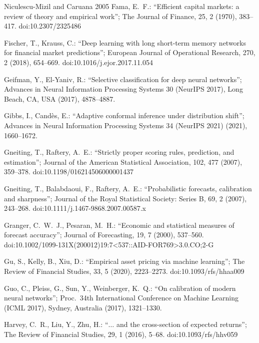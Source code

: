 \documentclass[10pt, a4paper, oneside]{article}
\theoremstyle{definition}
\theoremstyle{plain}
\begin{document}
{\begin{thebibliography}{Niculescu-Mizil and Caruana 2005}
Fama, E.\ F.: ``Efficient capital markets: a review of theory and empirical work'';
The Journal of Finance, 25, 2 (1970), 383--417. doi:10.2307/2325486

Fischer, T., Krauss, C.: ``Deep learning with long short-term memory networks for
financial market predictions''; European Journal of Operational Research, 270, 2
(2018), 654--669. doi:10.1016/j.ejor.2017.11.054

Geifman, Y., El-Yaniv, R.: ``Selective classification for deep neural networks'';
Advances in Neural Information Processing Systems 30 (NeurIPS 2017), Long Beach, CA,
USA (2017), 4878--4887.

Gibbs, I., Cand\`es, E.: ``Adaptive conformal inference under distribution shift'';
Advances in Neural Information Processing Systems 34 (NeurIPS 2021) (2021),
1660--1672.

Gneiting, T., Raftery, A.\ E.: ``Strictly proper scoring rules, prediction, and
estimation''; Journal of the American Statistical Association, 102, 477 (2007),
359--378. doi:10.1198/016214506000001437

Gneiting, T., Balabdaoui, F., Raftery, A.\ E.: ``Probabilistic forecasts, calibration
and sharpness''; Journal of the Royal Statistical Society: Series B, 69, 2 (2007),
243--268. doi:10.1111/j.1467-9868.2007.00587.x

Granger, C.\ W.\ J., Pesaran, M.\ H.: ``Economic and statistical measures of forecast
accuracy''; Journal of Forecasting, 19, 7 (2000), 537--560.
doi:10.1002/1099-131X(200012)19:7<537::AID-FOR769>3.0.CO;2-G

Gu, S., Kelly, B., Xiu, D.: ``Empirical asset pricing via machine learning''; The
Review of Financial Studies, 33, 5 (2020), 2223--2273. doi:10.1093/rfs/hhaa009

Guo, C., Pleiss, G., Sun, Y., Weinberger, K.\ Q.: ``On calibration of modern neural
networks''; Proc.\ 34th International Conference on Machine Learning (ICML 2017),
Sydney, Australia (2017), 1321--1330.

Harvey, C.\ R., Liu, Y., Zhu, H.: ``$\ldots$ and the cross-section of expected
returns''; The Review of Financial Studies, 29, 1 (2016), 5--68.
doi:10.1093/rfs/hhv059


\end{thebibliography}}
\end{document}
